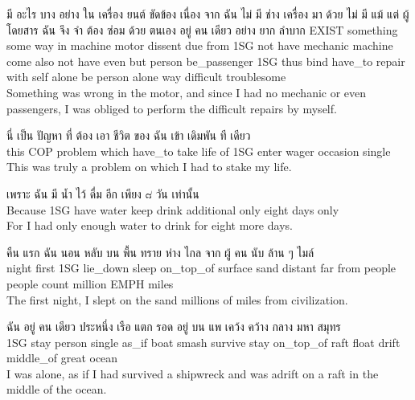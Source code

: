 \documentclass{book}
\begin{document}
	\begin{exe}
		\ex 
		\gll มี อะไร บาง อย่าง ใน เครื่อง ยนต์ ขัดข้อง เนื่อง จาก ฉัน ไม่ มี ช่าง เครื่อง มา ด้วย ไม่ มี แม้ แต่ ผู้ โดยสาร ฉัน จึง จำ ต้อง ซ่อม ด้วย ตนเอง อยู่ คน เดียว อย่าง ยาก ลำบาก
		\textsc{EXIST} something some way in machine motor dissent due from \textsc{1SG} not have mechanic machine come also not have even but person be\_passenger \textsc{1SG} thus bind have\_to repair with self alone be person alone way difficult troublesome\\
		Something was wrong in the motor, and since I had no mechanic or even passengers, I was obliged to perform the difficult repairs by myself.\\
	\end{exe}

	\begin{exe}
		\ex 
		\gll นี่ เป็น ปัญหา ที่ ต้อง เอา ชีวิต ของ ฉัน เข้า เดิมพัน ที เดียว\\
		this \textsc{COP} problem which have\_to take life of \textsc{1SG} enter wager occasion single\\
		This was truly a problem on which I had to stake my life.
	\end{exe}

	\begin{exe}
		\ex 
		\gll เพราะ ฉัน มี น้ำ ไว้ ดื่ม อีก เพียง ๘ วัน เท่านั้น\\
		Because \textsc{1SG} have water keep drink additional only eight days only\\
		For I had only enough water to drink for eight more days.
	\end{exe}

	\begin{exe}
		\ex 
		\gll คืน แรก ฉัน นอน หลับ บน พื้น ทราย ห่าง ไกล จาก ผู้ คน นับ ล้าน ๆ ไมล์\\
		night first \textsc{1SG} lie\_down sleep on\_top\_of surface sand distant far from people people count million \textsc{EMPH} miles\\
		The first night, I slept on the sand millions of miles from civilization.
	\end{exe}

	\begin{exe}
		\ex 
		\gll ฉัน อยู่ คน เดียว ประหนึ่ง เรือ แตก รอด อยู่ บน แพ เคว้ง คว้าง กลาง มหา สมุทร\\
		\textsc{1SG} stay person single as\_if boat smash survive stay on\_top\_of raft float drift middle\_of great ocean\\
		I was alone, as if I had survived a shipwreck and was adrift on a raft in the middle of the ocean.
	\end{exe}
\end{document}

